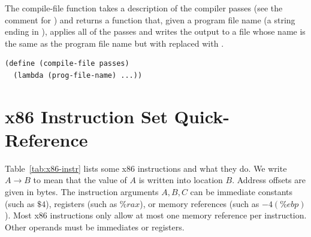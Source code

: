 \documentclass[11pt]{book}
\begin{document}
The compile-file function takes a description of the compiler passes
(see the comment for ) and returns a function that,
given a program file name (a string ending in ), applies all
of the passes and writes the output to a file whose name is the same
as the program file name but with  replaced with .
\begin{lstlisting}
(define (compile-file passes)
  (lambda (prog-file-name) ...))
\end{lstlisting}

\section{x86 Instruction Set Quick-Reference}
\label{sec:x86-quick-reference}


Table~\ref{tab:x86-instr} lists some x86 instructions and what they
do. We write $A \to B$ to mean that the value of $A$ is written into
location $B$.  Address offsets are given in bytes. The instruction
arguments $A, B, C$ can be immediate constants (such as $\$4$),
registers (such as $\%rax$), or memory references (such as
$-4(\%ebp)$). Most x86 instructions only allow at most one memory
reference per instruction.  Other operands must be immediates or
registers.
\end{document}
